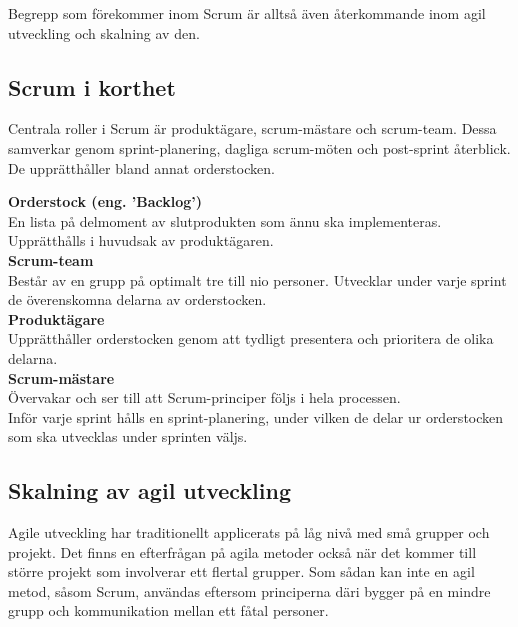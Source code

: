 		Begrepp som förekommer inom Scrum är alltså även återkommande inom agil utveckling och skalning av den.
		
	\subsection{Scrum i korthet}	
		
		Centrala roller i Scrum är produktägare, scrum-mästare och scrum-team. Dessa samverkar genom sprint-planering, dagliga scrum-möten och post-sprint återblick. De upprätthåller bland annat orderstocken.
		
		\textbf{Orderstock (eng. 'Backlog')} \\
		En lista på delmoment av slutprodukten som ännu ska implementeras. Upprätthålls i huvudsak av produktägaren. \\	
		
		\textbf{Scrum-team} \\
		Består av en grupp på optimalt tre till nio personer. Utvecklar under varje sprint de överenskomna delarna av orderstocken. \\
		
		\textbf{Produktägare} \\
		Upprätthåller orderstocken genom att tydligt presentera och prioritera de olika delarna. \\
		
		\textbf{Scrum-mästare} \\
		Övervakar och ser till att Scrum-principer följs i hela processen. \\
		
		Inför varje sprint hålls en sprint-planering, under vilken de delar ur orderstocken som ska utvecklas under sprinten väljs.
			
		\cite{scrum_guide}
		

	\subsection{Skalning av agil utveckling}
		
		Agile utveckling har traditionellt applicerats på låg nivå med små grupper och projekt. Det finns en efterfrågan på agila metoder också när det kommer till större projekt som involverar ett flertal grupper. Som sådan kan inte en agil metod, såsom Scrum, användas eftersom principerna däri bygger på en mindre grupp och kommunikation mellan ett fåtal personer.
		
